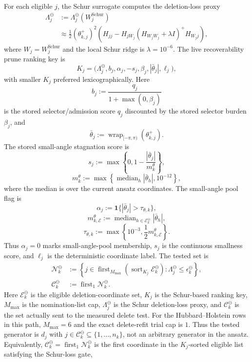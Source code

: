 \documentclass[
  reprint,
  amsmath,
  amssymb,
  aps,
  pra,
  nofootinbib,
  superscriptaddress,
  floatfix
]{revtex4-2}
\begin{document}
For each eligible \(j\), the Schur surrogate computes the deletion-loss proxy
\[
\begin{aligned}
\Lambda_j^{\ominus}
&:=
\Lambda_j^{\ominus}(W_j^{\mathrm{Schur}})
\\
&\approx
\frac12(\theta_{k,j}^+)^2
\left(
H_{jj}
-
H_{jW_j}
(H_{W_jW_j}+\lambda I)^+
H_{W_j j}
\right),
\end{aligned}
\]
where \(W_j=W_j^{\mathrm{Schur}}\) and the local Schur ridge is \(\lambda=10^{-6}\).  The live recoverability prune ranking key is
\[
K_j=
\bigl(
\Lambda_j^{\ominus},
b_j,
\alpha_j,
-s_j,
\beta_j,
|\bar\theta_j|,
\ell_j
\bigr),
\]
with smaller \(K_j\) preferred lexicographically.  Here
\[
b_j:=\frac{q_j}{1+\max(0,\beta_j)}
\]
is the stored selector/admission score \(q_j\) discounted by the stored selector burden \(\beta_j\), and
\[
\bar\theta_j
:=
\operatorname{wrap}_{[-\pi,\pi)}(\theta_{k,j}^+).
\]
The stored small-angle stagnation score is
\[
s_j
:=
\max\left\{0,1-\frac{|\bar\theta_j|}{m_k^\theta}\right\},
\]
\[
m_k^\theta
:=
\max\left\{
\operatorname{median}_{h}|\bar\theta_h|,
10^{-12}
\right\},
\]
where the median is over the current ansatz coordinates.
The small-angle pool flag is
\[
\alpha_j
:=
\mathbf 1\{|\bar\theta_j|>\tau_{\theta,k}\},
\]
\[
m_{k,\mathcal E}^{\theta}
:=
\operatorname{median}_{h\in\mathcal E_k^{\ominus}}
|\bar\theta_h|,
\]
\[
\tau_{\theta,k}
:=
\max\left\{
10^{-3},
\frac12 m_{k,\mathcal E}^{\theta}
\right\}.
\]
Thus \(\alpha_j=0\) marks small-angle-pool membership, \(s_j\) is the continuous smallness score, and \(\ell_j\) is the deterministic coordinate label.  The tested set is
\[
\begin{aligned}
\mathcal N_k^{\ominus}
&:=
\left\{
j\in
\operatorname{first}_{M_{\max}}
\left(
\operatorname{sort}_{K_j}
\mathcal E_k^{\ominus}
\right)
:
\Lambda_j^{\ominus}\le \epsilon_k^{\ominus}
\right\},
\\
\mathcal C_k^{\ominus}
&:=
\operatorname{first}_{1}
\mathcal N_k^{\ominus}.
\end{aligned}
\]
Here \(\mathcal E_k^{\ominus}\) is the eligible deletion-coordinate set, \(K_j\) is the Schur-based ranking key, \(M_{\max}\) is the nomination-list cap, \(\Lambda_j^{\ominus}\) is the Schur deletion-loss proxy, and \(\mathcal C_k^{\ominus}\) is the set actually sent to the measured delete test.  For the Hubbard--Holstein rows in this path, \(M_{\max}=6\) and the exact delete-refit trial cap is \(1\).  Thus the tested generator is \(d_j\) with \(j\in\mathcal C_k^{\ominus}\subseteq\{1,\ldots,n_k\}\), not an arbitrary generator in the ansatz.  Equivalently, \(\mathcal C_k^{\ominus}=\operatorname{first}_{1}\mathcal N_k^{\ominus}\) is the first coordinate in the \(K_j\)-sorted eligible list satisfying the Schur-loss gate,
\end{document}
